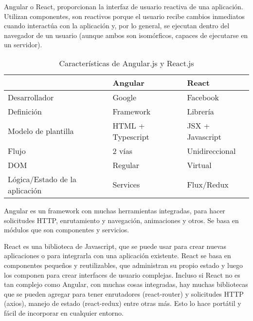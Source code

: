 Angular o React, proporcionan la interfaz de usuario reactiva de una aplicación. Utilizan componentes, son reactivos porque el usuario recibe cambios inmediatos cuando interactúa con la aplicación y, por lo general, se ejecutan dentro del navegador de un usuario (aunque ambos son isomórficos, capaces de ejecutarse en un servidor).
\vspace{0.8cm}

\begin{table}[H]
  \renewcommand{\arraystretch}{1.5}
  \centering
  \scriptsize
  \begin{tabular}{ |p{2cm}||p{5cm}|p{5cm}|  }
    \hline
      & Angular
      & React \\
    \hline
    Desarrollador
      & Google
      & Facebook \\
    \hline
    Definición
      & Framework
      & Librería \\
    \hline
    Modelo de plantilla
      & HTML + Typescript
      & JSX + Javascript \\
    \hline
    Flujo
      & 2 vías
      & Unidireccional \\
    \hline
    DOM
      & Regular
      & Virtual \\
    \hline
    Lógica/Estado de la aplicación
      & Services
      & Flux/Redux \\
    \hline
  \end{tabular}
  \caption{Características de Angular.js y React.js}
\end{table}
\vspace{0.8cm}

Angular es un framework con muchas herramientas integradas, para hacer solicitudes HTTP, enrutamiento y navegación, animaciones y otros. Se basa en módulos que son componentes y servicios.
\vspace{0.8cm}

React es una biblioteca de Javascript, que se puede usar para crear nuevas aplicaciones o para integrarla con una aplicación existente. React se basa en componentes pequeños y reutilizables, que administran su propio estado y luego los componen para crear interfaces de usuario complejas. Incluso si React no es tan complejo como Angular, con muchas cosas integradas, hay muchas bibliotecas que se pueden agregar para tener enrutadores (react-router) y solicitudes HTTP (axios), manejo de estado (react-redux) entre otras más. Esto lo hace portátil y fácil de incorporar en cualquier entorno.